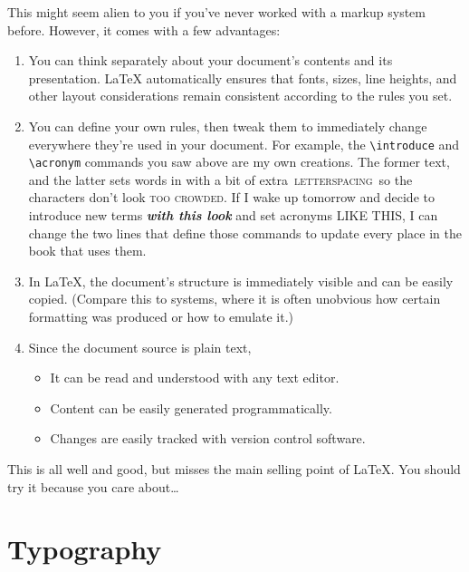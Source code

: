 This might seem alien to you if you've never worked with a markup system before.
However, it comes with a few advantages:
\begin{enumerate}
\item You can think separately about your document's contents and
    its presentation.
    \LaTeX{} automatically ensures that fonts, sizes, line heights,
    and other layout considerations remain consistent according to the rules
    you set.
\item You can define your own rules, then tweak them to immediately change
    everywhere they're used in your document.
    For example, the \verb|\introduce| and \verb|\acronym| commands you saw above
    are my own creations. The former  text, and
    the latter sets words in  with a bit of extra
    \,\textsc{letterspacing}\, so the characters
    don't look \textsc{too crowded}.
    If I wake up tomorrow and decide to introduce new terms
    \textbf{\itshape with this look} and set acronyms
    {\small{} LIKE THIS},
    I can change the two lines that define those commands
    to update every place in the book that uses them.
\item In \LaTeX, the document's structure is immediately visible
    and can be easily copied.
    (Compare this to  systems, where it is often unobvious
    how certain formatting was produced
    or how to emulate it.)
\item Since the document source is plain text,
    \begin{itemize}
    \item It can be read and understood with any text editor.
    \item Content can be easily generated programmatically.
    \item Changes are easily tracked with version control software.
    \end{itemize}
\end{enumerate}

This is all well and good,
but misses the main selling point of \LaTeX.
You should try it because you care about\ldots

\chapter{Typography}
\label{typography}

